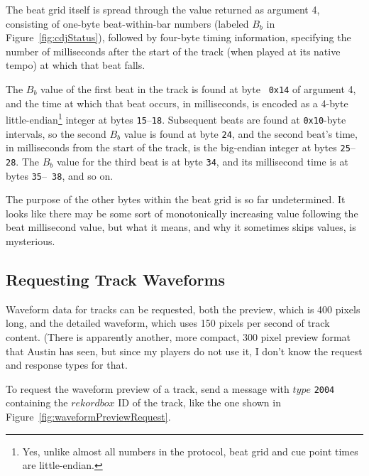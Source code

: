 \documentclass[11pt]{article}
\begin{document}
The beat grid itself is spread through the value returned as argument
4, consisting of one-byte beat-within-bar numbers (labeled $B_b$ in
Figure~\ref{fig:cdjStatus}), followed by four-byte timing information,
specifying the number of milliseconds after the start of the track
(when played at its native tempo) at which that beat falls.

The $B_b$ value of the first beat in the track is found at byte {\tt
  0x14} of argument 4, and the time at which that beat occurs, in
milliseconds, is encoded as a 4-byte little-endian\footnote{Yes,
  unlike almost all numbers in the protocol, beat grid and cue point
  times are little-endian.} integer at bytes {\tt 15}--{\tt 18}.
Subsequent beats are found at {\tt 0x10}-byte intervals, so the second
$B_b$ value is found at byte {\tt 24}, and the second beat's time, in
milliseconds from the start of the track, is the big-endian integer at
bytes {\tt 25}--{\tt 28}. The $B_b$ value for the third beat is at
byte {\tt 34}, and its millisecond time is at bytes {\tt 35}--{\tt
  38}, and so on.

The purpose of the other bytes within the beat grid is so far
undetermined. It looks like there may be some sort of monotonically
increasing value following the beat millisecond value, but what it
means, and why it sometimes skips values, is mysterious.

\subsection{Requesting Track Waveforms}

Waveform data for tracks can be requested, both the preview, which is
400 pixels long, and the detailed waveform, which uses 150 pixels per
second of track content. (There is apparently another, more compact,
300 pixel preview format that Austin has seen, but since my players do
not use it, I don't know the request and response types for that.

To request the waveform preview of a track, send a message with $type$
{\tt 2004} containing the $rekordbox$ ID of the track, like the one
shown in Figure~\ref{fig:waveformPreviewRequest}.
\end{document}
